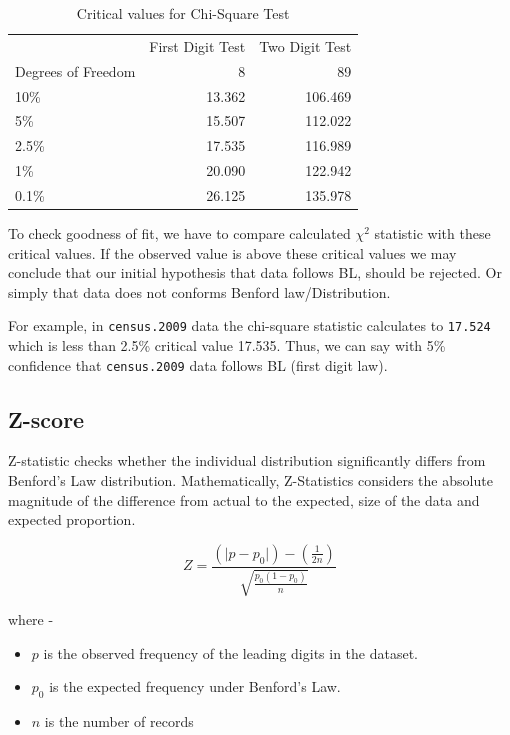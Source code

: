 \documentclass[
]{book}
\providecommand{\tightlist}{%
  \setlength{\itemsep}{0pt}\setlength{\parskip}{0pt}}
\begin{document}
\begin{table}

\caption{\label{tab:tab6}Critical values for Chi-Square Test}
\centering
\begin{tabular}[t]{lrr}
\toprule
\multicolumn{1}{c}{ } & \multicolumn{1}{c}{First Digit Test} & \multicolumn{1}{c}{Two Digit Test} \\
\cmidrule(l{3pt}r{3pt}){2-2} \cmidrule(l{3pt}r{3pt}){3-3}
Degrees of Freedom & 8 & 89\\
\midrule
10\% & 13.362 & 106.469\\
5\% & 15.507 & 112.022\\
2.5\% & 17.535 & 116.989\\
1\% & 20.090 & 122.942\\
0.1\% & 26.125 & 135.978\\
\bottomrule
\end{tabular}
\end{table}

To check goodness of fit, we have to compare calculated \(χ^2\) statistic with these critical values. If the observed value is above these critical values we may conclude that our initial hypothesis that data follows BL, should be rejected. Or simply that data does not conforms Benford law/Distribution.

For example, in \texttt{census.2009} data the chi-square statistic calculates to \texttt{17.524} which is less than 2.5\% critical value 17.535. Thus, we can say with 5\% confidence that \texttt{census.2009} data follows BL (first digit law).

\hypertarget{z-score}{%
\subsection{Z-score}\label{z-score}}

Z-statistic checks whether the individual distribution significantly differs from Benford's Law distribution. Mathematically, Z-Statistics considers the absolute magnitude of the difference from actual to the expected, size of the data and expected proportion.

\begin{equation} 
Z = \frac{(\lvert p - p_0\rvert) - (\frac{1}{2n})}{\sqrt{\frac{p_0(1-p_0)}{n}}}
\label{eq:ben4}
\end{equation} 

where -

\begin{itemize}
\tightlist
\item
  \(p\) is the observed frequency of the leading digits in the dataset.
\item
  \(p_0\) is the expected frequency under Benford's Law.
\item
  \(n\) is the number of records
\end{itemize}
\end{document}
